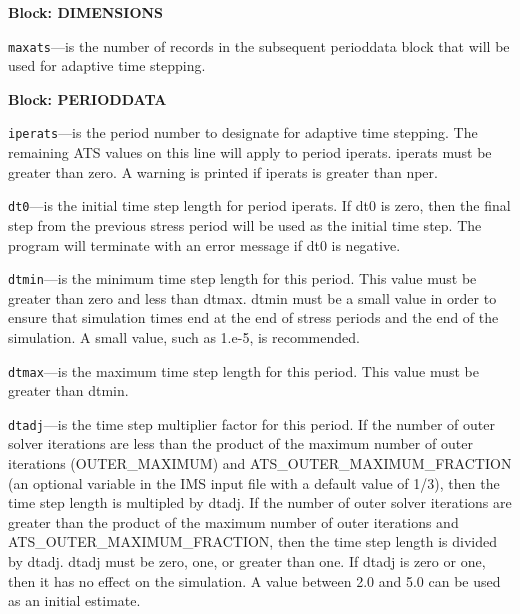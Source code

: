 
\item \textbf{Block: DIMENSIONS}

\begin{description}
\item \texttt{maxats}---is the number of records in the subsequent perioddata block that will be used for adaptive time stepping.

\end{description}
\item \textbf{Block: PERIODDATA}

\begin{description}
\item \texttt{iperats}---is the period number to designate for adaptive time stepping.  The remaining ATS values on this line will apply to period iperats.  iperats must be greater than zero.  A warning is printed if iperats is greater than nper.

\item \texttt{dt0}---is the initial time step length for period iperats.  If dt0 is zero, then the final step from the previous stress period will be used as the initial time step.  The program will terminate with an error message if dt0 is negative.

\item \texttt{dtmin}---is the minimum time step length for this period.  This value must be greater than zero and less than dtmax.  dtmin must be a small value in order to ensure that simulation times end at the end of stress periods and the end of the simulation.  A small value, such as 1.e-5, is recommended.

\item \texttt{dtmax}---is the maximum time step length for this period.  This value must be greater than dtmin.

\item \texttt{dtadj}---is the time step multiplier factor for this period.  If the number of outer solver iterations are less than the product of the maximum number of outer iterations (OUTER\_MAXIMUM) and ATS\_OUTER\_MAXIMUM\_FRACTION (an optional variable in the IMS input file with a default value of 1/3), then the time step length is multipled by dtadj.  If the number of outer solver iterations are greater than the product of the maximum number of outer iterations and ATS\_OUTER\_MAXIMUM\_FRACTION, then the time step length is divided by dtadj.  dtadj must be zero, one, or greater than one.  If dtadj is zero or one, then it has no effect on the simulation.  A value between 2.0 and 5.0 can be used as an initial estimate.


\end{description}
